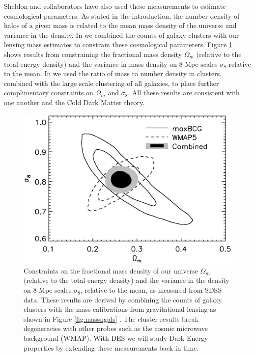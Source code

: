 \documentclass[12pt]{article}
\begin{document}
Sheldon and collaborators have also used these measurements to estimate
cosmological parameters.  As stated in the introduction, the number density of
halos of a given mass is related to the mean mass density of the universe and
variance in the density.  In \cite{RozoCosmo09} we combined the counts of
galaxy clusters with our lensing mass estimates to constrain these cosmological
parameters.  Figure \ref{fig:omegasigma8} shows results from \cite{RozoCosmo09}
constraining the fractional mass density $\Omega_m$ (relative to the total
energy density) and the variance in mass density on 8 Mpc scales $\sigma_8$
relative to the mean. In \cite{TinkerM2N2012} we used the ratio of mass to
number density in clusters, combined with the large scale clustering of all
galaxies, to place further complimentary constraints on $\Omega_m$ and
$\sigma_8$.  All these results are consistent with one another and the Cold
Dark Matter theory.

\begin{figure}[p] 
\centering 
\includegraphics[scale=0.6]{s8_Om.ps}

\caption{Constraints on the fractional mass density of our universe $\Omega_m$
    (relative to the total energy density) and the variance in the density on 8
    Mpc scales $\sigma_8$, relative to the mean, as measured from SDSS data.
    These results \cite{RozoCosmo09} are derived by combining the counts of
    galaxy clusters with the mass calibrations from gravitational lensing as
    shown in Figure \ref{fig:massngals}
    \cite{SheldonLensing07,JohnstonLensing07}.  The cluster results break
degeneracies with other probes such as the cosmic microwave background (WMAP).
With DES we will study Dark Energy properties by extending these measurements
back in time.  \label{fig:omegasigma8}} 

\end{figure}
\end{document}
